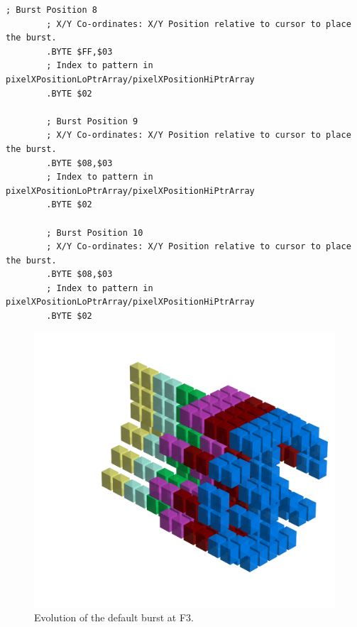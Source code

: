 \begin{lstlisting}[basicstyle=\tiny,caption=Source code for the F3 Burst.]
        ; Burst Position 8
        ; X/Y Co-ordinates: X/Y Position relative to cursor to place the burst.
        .BYTE $FF,$03
        ; Index to pattern in pixelXPositionLoPtrArray/pixelXPositionHiPtrArray
        .BYTE $02

        ; Burst Position 9
        ; X/Y Co-ordinates: X/Y Position relative to cursor to place the burst.
        .BYTE $08,$03
        ; Index to pattern in pixelXPositionLoPtrArray/pixelXPositionHiPtrArray
        .BYTE $02

        ; Burst Position 10
        ; X/Y Co-ordinates: X/Y Position relative to cursor to place the burst.
        .BYTE $08,$03
        ; Index to pattern in pixelXPositionLoPtrArray/pixelXPositionHiPtrArray
        .BYTE $02
\end{lstlisting}

\clearpage
\begin{figure}[H]
    \centering
    \begin{adjustbox}{width=12cm,center}
      \includegraphics[width=12cm]{src/patterns/bursts/pattern3-45.png}%
    \end{adjustbox}
\caption{Evolution of the default burst at F3.}
\end{figure}
\clearpage

